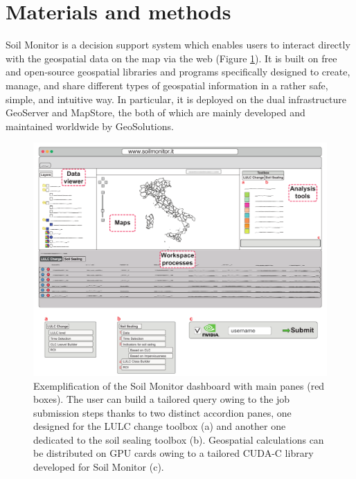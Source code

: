 \documentclass[APA,LATO1COL,doublespace]{WileyNJD-v2}
\begin{document}
\section{Materials and methods} \label{sec:MatMet}
Soil Monitor is a decision support system which enables users to interact directly with the geospatial data on the map via the web (Figure \ref{fig:SMapp}).
It is built on free and open-source geospatial libraries and programs specifically designed to create, manage, and share different types of geospatial information in a rather safe, simple, and intuitive way.
In particular, it is deployed on the dual infrastructure GeoServer and MapStore, the both of which are mainly developed and maintained worldwide by GeoSolutions.

\begin{figure}[t] %
    \centerline{\includegraphics[width=500pt]{daMileti/01_piattaforma.pdf}}
    \caption{Exemplification of the Soil Monitor dashboard with main panes (red boxes). 
    The user can build a tailored query owing to the job submission steps thanks to two distinct accordion panes, one designed for the LULC change toolbox (a) and another one dedicated to the soil sealing toolbox (b). 
    Geospatial calculations can be distributed on GPU cards owing to a tailored CUDA-C library developed for Soil Monitor (c). } \label{fig:SMapp}
\end{figure}
\end{document}
